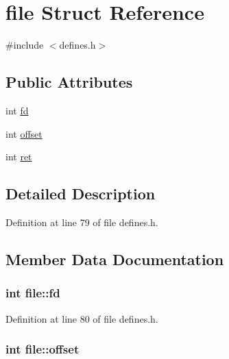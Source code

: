 \hypertarget{structfile}{\section{file Struct Reference}
\label{structfile}
}


{\ttfamily \#include $<$defines.\-h$>$}

\subsection*{Public Attributes}
\begin{DoxyCompactItemize}
\item 
int \hyperlink{structfile_abcdc3058fcb2b789cd4ce5f62f274363}{fd}
\item 
int \hyperlink{structfile_ad056d2081f3cab9ed4668689a02acaaf}{offset}
\item 
int \hyperlink{structfile_a6d285b7a32eb853a1dcb00014942d8ae}{ret}
\end{DoxyCompactItemize}


\subsection{Detailed Description}


Definition at line 79 of file defines.\-h.



\subsection{Member Data Documentation}
\hypertarget{structfile_abcdc3058fcb2b789cd4ce5f62f274363}{
\subsubsection[{fd}]{\setlength{\rightskip}{0pt plus 5cm}int file\-::fd}}\label{structfile_abcdc3058fcb2b789cd4ce5f62f274363}


Definition at line 80 of file defines.\-h.

\hypertarget{structfile_ad056d2081f3cab9ed4668689a02acaaf}{
\subsubsection[{offset}]{\setlength{\rightskip}{0pt plus 5cm}int file\-::offset}}\label{structfile_ad056d2081f3cab9ed4668689a02acaaf}


